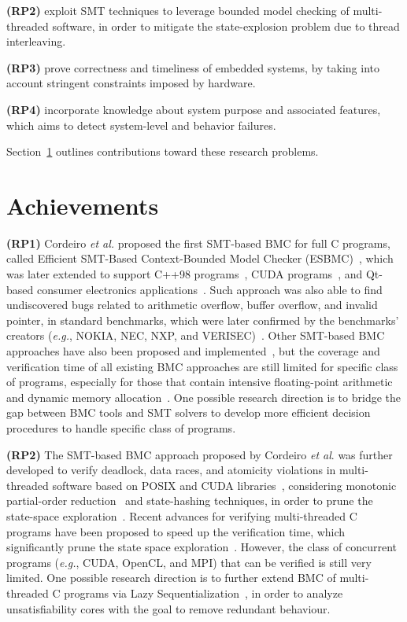 \documentclass{acm_sen_article}
\begin{document}
\textbf{(RP2)} exploit SMT techniques to leverage bounded model checking of multi-threaded software, in order to mitigate the state-explosion problem due to thread interleaving.
	
\textbf{(RP3)} prove correctness and timeliness of embedded systems, by taking into account stringent constraints imposed by hardware.
	
\textbf{(RP4)} incorporate knowledge about system purpose and associated features, which aims to detect system-level and behavior failures.

Section~\ref{achievements} outlines contributions toward these research problems.

\section{Achievements}
\label{achievements}

\textbf{(RP1)} Cordeiro {\it et al.} proposed the first SMT-based BMC for full C programs, called Efficient SMT-Based Context-Bounded Model Checker (ESBMC)~\cite{Cordeiro12}, which was later extended to support C++98 programs~\cite{ECBS13}, CUDA programs~\cite{Pereira15}, and Qt-based consumer electronics applications~\cite{Sousa15}. Such approach was also able to find undiscovered bugs related to arithmetic overflow, buffer overflow, and invalid pointer, in standard benchmarks, which were later confirmed by the benchmarks' creators ({\it e.g.}, NOKIA, NEC, NXP, and VERISEC)~\cite{CordeiroF11,Cordeiro12}. Other SMT-based BMC approaches have also been proposed and implemented~\cite{MerzFS12}, but the coverage and verification time of all existing BMC approaches are still limited for specific class of programs, especially for those that contain intensive floating-point arithmetic and dynamic memory allocation~\cite{Beyer14,BeyerSVCOMP15}. One possible research direction is to bridge the gap between BMC tools and SMT solvers to develop more efficient decision procedures to handle specific class of programs.

\textbf{(RP2)} The SMT-based BMC approach proposed by Cordeiro {\it et al}. was further developed to verify deadlock, data races, and atomicity violations in multi-threaded software based on POSIX and CUDA libraries~\cite{CordeiroF11,Pereira15}, considering monotonic partial-order reduction~\cite{KahlonWG09} and state-hashing techniques, in order to prune the state-space exploration~\cite{morse15}. Recent advances for verifying multi-threaded C programs have been proposed to speed up the verification time, which significantly prune the state space exploration~\cite{Inverso14,civl15}. However, the class of concurrent programs ({\it e.g.}, CUDA, OpenCL, and MPI) that can be verified is still very limited. One possible research direction is to further extend BMC of multi-threaded C programs via Lazy Sequentialization~\cite{Inverso14}, in order to analyze unsatisfiability cores with the goal to remove redundant behaviour.
\end{document}
